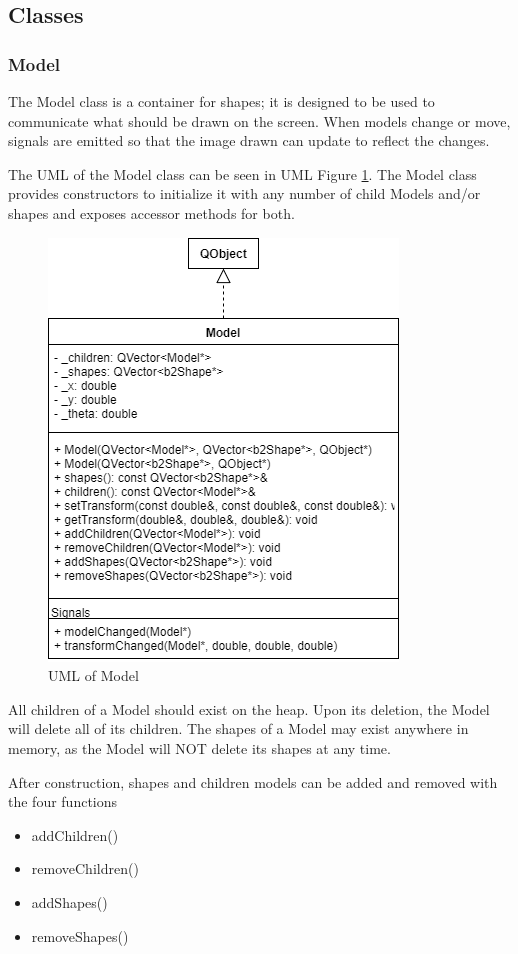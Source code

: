  \newpage
\subsection{Classes}
  \subsubsection*{Model}
  The Model class is a container for shapes; it is designed to be used to communicate what should be drawn on the screen. When models change or move, signals are emitted so that the image drawn can update to reflect the changes.
  
 	The UML of the Model class can be seen in UML Figure \ref{uml:model}. The Model class provides constructors to initialize it with any number of child Models and/or shapes and exposes accessor methods for both.

 \begin{figure}[h]
 	\begin{center}
 	\includegraphics[scale=0.5]{./images_design/uml/Model}
 	\caption{UML of Model\label{uml:model}}
 	\end{center}
 \end{figure}  
 
 All children of a Model should exist on the heap. Upon its deletion, the Model will delete all of its children. The shapes of a Model may exist anywhere in memory, as the Model will NOT delete its shapes at any time. 
 
After construction, shapes and children models can be added and removed with the four functions
 \begin{itemize}
 	\item addChildren()
 	\item removeChildren()
 	\item addShapes()
 	\item removeShapes()
 \end{itemize} 
 
